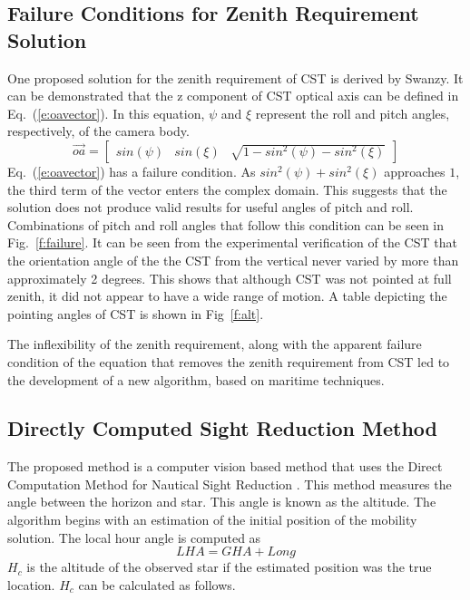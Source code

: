 \documentclass[]{aiaa-tc}%
\begin{document}
\subsection*{Failure Conditions for Zenith Requirement Solution}
One proposed solution for the zenith requirement of CST is derived by Swanzy.  It can be demonstrated that the z component of CST optical axis can be defined in Eq.~(\ref{e:oavector}).  In this equation, $\psi$ and $\xi$ represent the roll and pitch angles, respectively, of the camera body.  
\begin{equation}
 \label{e:oavector}
    \overrightarrow{oa} =
    \begin{bmatrix} 
    sin(\psi) & sin(\xi) & \sqrt{1-sin^{2}(\psi)-sin^{2}(\xi)}
    \end{bmatrix}
\end{equation}
Eq.~(\ref{e:oavector}) has a failure condition.  As $sin^{2}(\psi)+sin^{2}(\xi)$ approaches $1$, the third term of the vector enters the complex domain.  This suggests that the solution does not produce valid results for useful angles of pitch and roll. Combinations of pitch and roll angles that follow this condition can be seen in Fig.~\ref{f:failure}.
It can be seen from the experimental verification of the CST that the orientation angle of the the CST from the vertical never varied by more than approximately 2 degrees. This shows that although CST was not pointed at full zenith, it did not appear to have a wide range of motion.  A table depicting the pointing angles of CST is shown in Fig~\ref{f:alt}.

The inflexibility of the zenith requirement, along with the apparent failure condition of the equation that removes the zenith requirement from CST led to the development of a new algorithm, based on maritime techniques.  \\

\subsection*{Directly Computed Sight Reduction Method}
The proposed method is a computer vision based method that uses the Direct Computation Method for Nautical Sight Reduction \cite{b:naut}.  This method measures the angle between the horizon and star.  This angle is known as the altitude.  The algorithm begins with an estimation of the initial position of the mobility solution. The local hour angle is computed as
\begin{equation}
 \label{e:LHA}
    LHA = GHA + Long
\end{equation}
$H_{c}$ is the altitude of the observed star if the estimated position was the true location.  $H_{c}$ can be calculated as follows.
\end{document}
